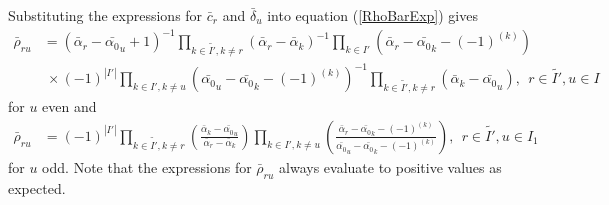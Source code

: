 \documentclass[12pt]{article}
\begin{document}
Substituting the expressions for $\bar{c}_r$ and $\bar{\delta}_u$ into equation 
 (\ref{RhoBarExp}) gives
\begin{align*}
\bar{\rho}_{ru} &= (\bar{\alpha}_r-\bar{\alpha_0}_u + 1)^{-1}\prod_{k\in \tilde{I'},k\neq r} \left(\bar{\alpha}_r - \bar{\alpha}_k \right)^{-1}\prod_{k\in
I'} \left(\bar{\alpha}_r - \bar{\alpha_0}_k - (-1)^{(k)}\right) \\
& ~\times (-1)^{|I'|} \prod_{k\in I',k\neq u} \left(\bar{\alpha_0}_u - \bar{\alpha_0}_k -
(-1)^{(k)}\right)^{-1}\prod_{k\in\tilde{I'},k \neq r} \left(\bar{\alpha}_k - \bar{\alpha_0}_u \right),\ \ r\in \tilde{I'},u\in I 
\end{align*}
for $u$ even and
\begin{align*}
\bar{\rho}_{ru} &= (-1)^{|I'|} \prod_{k\in \tilde{I'},k\neq r} 
\left(
\frac 
{\bar{\alpha}_k - \bar{\alpha_0}_u  }
{\bar{\alpha}_r - \bar{\alpha}_k }
\right)
\prod_{k\in I',k \neq u} 
\left(
\frac
{ \bar{\alpha}_r - \bar{\alpha_0}_k - (-1)^{(k)} }
{\bar{\alpha_0}_u - \bar{\alpha_0}_k - (-1)^{(k)} }
\right)
,\ \ r\in \tilde{I'},u\in I_1
\end{align*}
for $u$ odd. Note that the expressions for $\bar{\rho}_{ru}$ always evaluate to positive values as expected.

\end{document}
